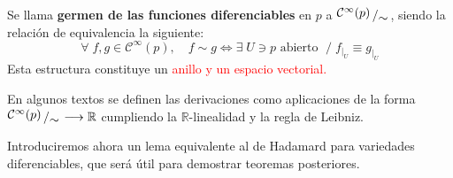 \begin{defi}
Se llama \textbf{germen de las funciones diferenciables} en $p$ a $\modulo{\mathcal{C}^{\infty}(p)}{\sim}$, siendo la relación de equivalencia la siguiente:
$$\forall \; f,g\in \mathcal{C}^{\infty}(p), \quad f\sim g \iff \exists\;U \ni p \text{ abierto } \;/\; f_{|_U} \equiv g_{|_U}$$Esta estructura constituye un \textcolor{red}{anillo y un espacio vectorial.}
\end{defi}

\begin{obs}
En algunos textos se definen las derivaciones como aplicaciones de la forma $\modulo{\mathcal{C}^{\infty}(p)}{\sim} \longrightarrow \mathbb{R}$ cumpliendo la $\mathbb{R}$-linealidad y la regla de Leibniz.
\end{obs}

Introduciremos ahora un lema equivalente al de Hadamard para variedades diferenciables, que será útil para demostrar teoremas posteriores.

